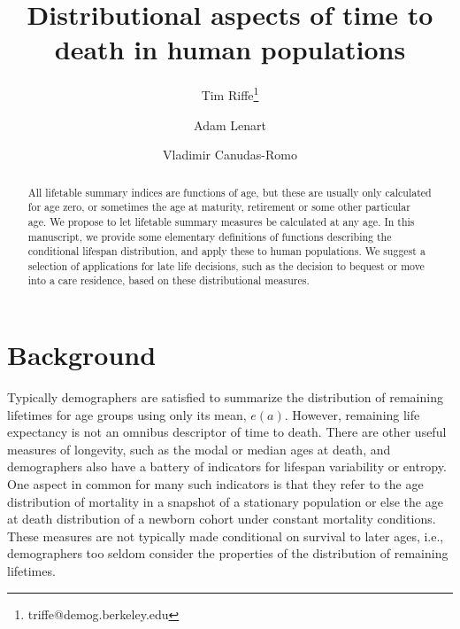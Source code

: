 \documentclass{article}
\begin{document}
\title{Distributional aspects of time to death in human populations}

\author[1]{Tim Riffe\thanks{triffe@demog.berkeley.edu}}
\author[2,3]{Adam Lenart}
\author[2,3]{Vladimir Canudas-Romo}

\maketitle

\begin{abstract}
All lifetable summary indices are functions of age, but these are usually
only calculated for age zero, or sometimes the age at maturity, retirement or
some other particular age. We propose to let lifetable summary measures be
calculated at any age. In this manuscript, we provide some elementary definitions of functions describing the
conditional lifespan distribution, and apply these to human populations.
We suggest a selection of applications for late life
decisions, such as the decision to bequest or move into a care residence, based
on these distributional measures.
\end{abstract}

 \linespread{1.3}
\section*{Background}

Typically demographers are satisfied to summarize the distribution of remaining
lifetimes for age groups using only its mean, $e(a)$. However, remaining life
expectancy is not an omnibus descriptor of time to death. There are other
useful measures of longevity, such as the modal or median ages at death, and demographers also have a battery of
indicators for lifespan variability or entropy. One aspect in common for many
such indicators is that they refer to the age distribution of mortality in a snapshot of a stationary population or else the age at death distribution of a newborn cohort under constant mortality
conditions. These measures are not typically made conditional on survival to
later ages, i.e., demographers too seldom consider the properties of the
distribution of remaining lifetimes. 
\end{document}
